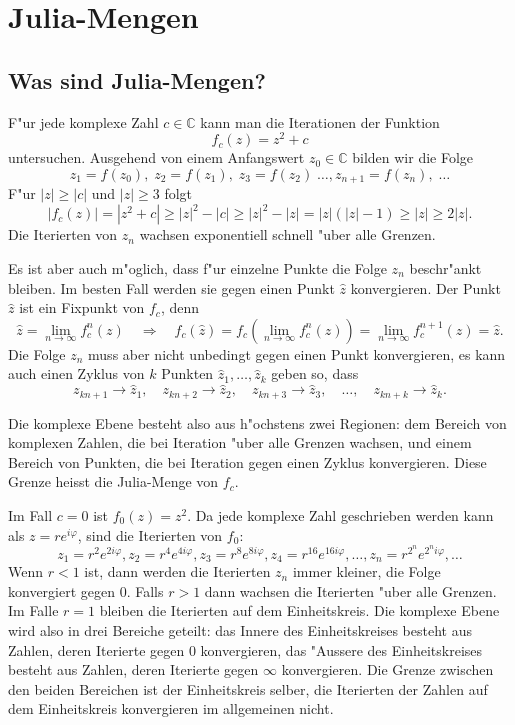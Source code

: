\chapter{Julia-Mengen}
\begin{refsection}

\section{Was sind Julia-Mengen?}
F"ur jede komplexe Zahl $c\in\mathbb C$ kann man die Iterationen der
Funktion
\begin{equation}
f_c(z)=z^2 + c
\label{julia:quadratic}
\end{equation}
untersuchen.
Ausgehend von einem Anfangswert $z_0\in\mathbb C$ bilden wir die Folge
\[
z_1=f(z_0),\;z_2=f(z_1),\;z_3=f(z_2)\;\dots, z_{n+1}=f(z_n),\;\dots
\]
F"ur $|z|\ge |c|$ und $|z|\ge 3$ folgt
\[
|f_c(z)|= |z^2+c|\ge |z|^2-|c|\ge |z|^2-|z|=|z|(|z|-1)\ge |z|\ge 2|z|.
\]
Die Iterierten von $z_n$ wachsen exponentiell schnell "uber alle Grenzen.

Es ist aber auch m"oglich, dass f"ur einzelne Punkte die Folge $z_n$ 
beschr"ankt bleiben. Im besten Fall werden sie gegen einen Punkt
$\hat z$ konvergieren.
Der Punkt $\hat z$ ist ein Fixpunkt von $f_c$, denn
\[
\hat z = \lim_{n\to \infty}f_c^{n}(z)\quad\Rightarrow\quad
f_c(\hat z)=f_c(\lim_{n\to\infty}f_c^n(z))=\lim_{n\to\infty}f_c^{n+1}(z)=\hat z.
\]
Die Folge $z_n$ muss aber nicht unbedingt gegen einen Punkt konvergieren,
es kann auch einen Zyklus von $k$ Punkten $\hat z_1,\dots,\hat z_k$ geben
so, dass
\[
z_{kn+1}\to \hat z_1,\quad
z_{kn+2}\to \hat z_2,\quad
z_{kn+3}\to \hat z_3,\quad\dots,\quad
z_{kn+k}\to \hat z_k.
\]

Die komplexe Ebene besteht also aus h"ochstens zwei Regionen: dem Bereich
von komplexen Zahlen, die bei Iteration "uber alle Grenzen wachsen, und
einem Bereich von Punkten, die bei Iteration gegen einen Zyklus konvergieren.
Diese Grenze heisst die Julia-Menge von $f_c$.

\begin{beispiel}
Im Fall $c=0$ ist $f_0(z)=z^2$. Da jede komplexe Zahl geschrieben werden
kann als $z=re^{i\varphi}$, sind die Iterierten von $f_0$:
\[
z_1=r^2e^{2i\varphi},
z_2=r^4e^{4i\varphi},
z_3=r^8e^{8i\varphi},
z_4=r^{16}e^{16i\varphi},\dots,
z_n=r^{2^n}e^{2^ni\varphi},\dots
\]
Wenn $r < 1$ ist, dann werden die Iterierten $z_n$ immer kleiner, die
Folge konvergiert gegen $0$.
Falls $r>1$ dann wachsen die Iterierten "uber alle Grenzen.
Im Falle $r=1$ bleiben die Iterierten auf dem Einheitskreis.
Die komplexe Ebene wird also in drei Bereiche geteilt: das
Innere des Einheitskreises besteht aus Zahlen, deren Iterierte gegen
0 konvergieren, das "Aussere des Einheitskreises besteht aus Zahlen,
deren Iterierte gegen $\infty$ konvergieren.
Die Grenze zwischen den beiden Bereichen ist der Einheitskreis selber,
die Iterierten der Zahlen auf dem Einheitskreis konvergieren im
allgemeinen nicht.


\end{beispiel}
\end{refsection}
